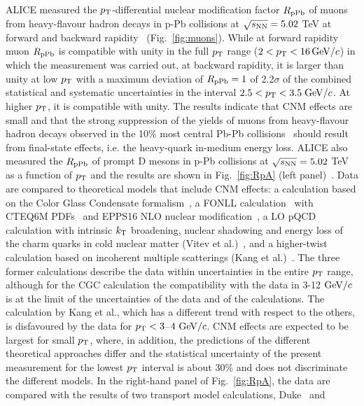 ALICE measured the $p_{\rm T}$-differential nuclear modification factor 
$R_{\rm pPb}$ of muons from heavy-flavour hadron decays in p-Pb collisions at $\sqrt{s_{\rm NN}} = 5.02$ TeV
at forward and backward rapidity~\cite{Acharya:2017hdv} (Fig.~\ref{fig:muons}).
While at forward rapidity muon $R_{\rm pPb}$ is compatible 
with unity in the full $p_{\rm T}$ range ($2 <p_{\rm T} < 16 \, \mathrm{GeV}/c$) in which the 
measurement was carried out, 
at backward rapidity, it is larger than unity at low $p_{\rm T}$ with a maximum 
deviation of $R_{\rm pPb}=1$ of 2.2$\sigma$ of the combined statistical and 
systematic uncertainties in the interval $2.5 < p_{\rm T} < 3.5 \;\mathrm{GeV}/c$. 
At higher $p_{\rm T}$, it is compatible with unity. The results indicate
that CNM effects are small and that the strong suppression of the
yields of muons from heavy-flavour hadron decays observed in the
10\% most central Pb-Pb collisions~\cite{Abelev:2012qh} should result from final-state
effects, i.e. the heavy-quark in-medium energy loss. 
ALICE also measured the $R_{\rm pPb}$ of prompt 
D mesons in p-Pb collisions at $\sqrt{s_{\rm NN}} = 5.02$ TeV
as a function of $p_{\rm T}$ and the results are shown in 
Fig.~\ref{fig:RpA} (left panel)~\cite{ALICEPAS2017008}. 
Data are compared to theoretical models that include CNM effects: 
a calculation based on the Color Glass Condensate
formalism~\cite{Fujii:2013yja,Fujii:2017rqa}, a FONLL 
calculation~\cite{Cacciari:2012ny} with CTEQ6M PDFs~\cite{Pumplin:2002vw} 
and EPPS16 NLO nuclear modification~\cite{Eskola:2016oht}, 
a LO pQCD calculation with intrinsic $k_{\rm T}$ broadening, 
nuclear shadowing and energy loss of the charm quarks 
in cold nuclear matter (Vitev et al.)~\cite{Sharma:2009hn}, 
and a higher-twist calculation based on incoherent multiple 
scatterings (Kang et al.)~\cite{Kang:2014hha}. 
The three former calculations describe the data within 
uncertainties in the entire $p_{\rm T}$ range, although for the CGC 
calculation the compatibility with the data 
in 3-12 $\mathrm{GeV}/c$ is at the limit of the uncertainties of the data 
and of the calculations. The calculation by Kang et al., which has 
a different trend with respect to the others, is disfavoured by the 
data for $p_{\rm T}<3$--$4~\mathrm{GeV}/c$.
CNM effects are expected to be largest for small $p_{\rm T}$, where, in 
addition, the predictions of the different theoretical approaches differ 
and the statistical uncertainty of the present measurement for the 
lowest $p_{\rm T}$ interval is about 30\% and does not 
discriminate the different models.
In the right-hand panel of Fig.~\ref{fig:RpA}, the data are 
compared with the results of two transport model 
calculations, Duke~\cite{Xu:2015iha} and 
